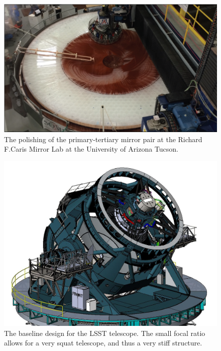 \documentclass{emulateapj}
\begin{document}
\begin{figure}
\includegraphics[width=1.0\hsize,clip]{polishing.pdf}
\caption{The polishing of the primary-tertiary mirror pair at the Richard F.Caris Mirror Lab at the University of Arizona Tucson. } 
\label{Fig:polishing}
\end{figure}




\begin{figure}
\includegraphics[width=1.0\hsize,clip]{TMA_Image-Oct-2017.JPG}
\caption{The baseline design for the 
LSST telescope.  The small focal ratio allows for a very squat
telescope, and thus a very stiff structure.  } 
\label{Fig:telescope}
\end{figure}
\end{document}
